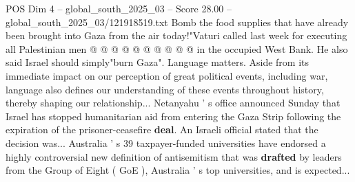 \begin{textsample}{POS Dim 4 – global\_south\_2025\_03 – Score 28.00 – global\_south\_2025\_03/121918519.txt}
Bomb the food supplies that have already been brought into Gaza from the air today!"Vaturi called last week for executing all Palestinian men @ @ @ @ @ @ @ @ @ @ in the occupied West Bank.
He also said Israel should simply"burn Gaza".
Language matters.
Aside from its immediate impact on our perception of great political events, including war, language also defines our understanding of these events throughout history, thereby shaping our relationship...
Netanyahu ' s office announced Sunday that Israel has stopped humanitarian aid from entering the Gaza Strip following the expiration of the prisoner-ceasefire \textbf{deal}.
An Israeli official stated that the decision was...
Australia ' s 39 taxpayer-funded universities have endorsed a highly controversial new definition of antisemitism that was \textbf{drafted} by leaders from the Group of Eight ( GoE ), Australia ' s top universities, and is expected...

\end{textsample}
